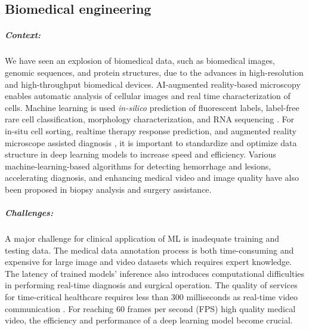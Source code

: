 \subsection{Biomedical engineering}

\subparagraph*{Context:} We have seen an explosion of biomedical data, such as biomedical images, genomic sequences, and protein structures, due to the advances in high-resolution and high-throughput biomedical devices. 
AI-augmented reality-based microscopy \cite{Chen2019-ze} enables automatic analysis of cellular images and real time characterization of cells. Machine learning is used \textit{in-silico} prediction of fluorescent labels, label-free rare cell classification, morphology characterization, and RNA sequencing \cite{Christiansen2018-eu,Wang2020-lr,Siu2020-kd,Tang2018-mj,Li2020-cx}. For in-situ cell sorting, realtime therapy response prediction, and augmented reality microscope assisted diagnosis \cite{Chen2019-ze,Nitta2018-bc,Sakellaropoulos2019-tq}, it is important to standardize and optimize data structure in deep learning models to increase speed and efficiency. Various machine-learning-based algorithms for detecting hemorrhage and lesions, accelerating diagnosis, and enhancing medical video and image quality have also been proposed in biopsy analysis and surgery assistance.
        
\subparagraph*{Challenges:} A major challenge for clinical application of ML is inadequate training and testing data. The medical data annotation process is both time-consuming and expensive for large image and video datasets which requires expert knowledge. 
The latency of trained models' inference also introduces computational difficulties in performing real-time diagnosis and surgical operation. 
The quality of services for time-critical healthcare requires less than 300 milliseconds as real-time video communication \cite{Shukla2019-bz}. For reaching 60 frames per second (FPS) high quality medical video, the efficiency and performance of a deep learning model become crucial.
        
